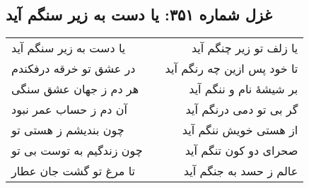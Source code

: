 \begin{center}
\section*{غزل شماره ۳۵۱: یا دست به زیر سنگم آید}
\label{sec:351}
\begin{longtable}{l p{0.5cm} r}
یا دست به زیر سنگم آید
&&
یا زلف تو زیر چنگم آید
\\
در عشق تو خرقه درفکندم
&&
تا خود پس ازین چه رنگم آید
\\
هر دم ز جهان عشق سنگی
&&
بر شیشهٔ نام و ننگم آید
\\
آن دم ز حساب عمر نبود
&&
گر بی تو دمی درنگم آید
\\
چون بندیشم ز هستی تو
&&
از هستی خویش ننگم آید
\\
چون زندگیم به توست بی تو
&&
صحرای دو کون تنگم آید
\\
تا مرغ تو گشت جان عطار
&&
عالم ز حسد به جنگم آید
\\
\end{longtable}
\end{center}
